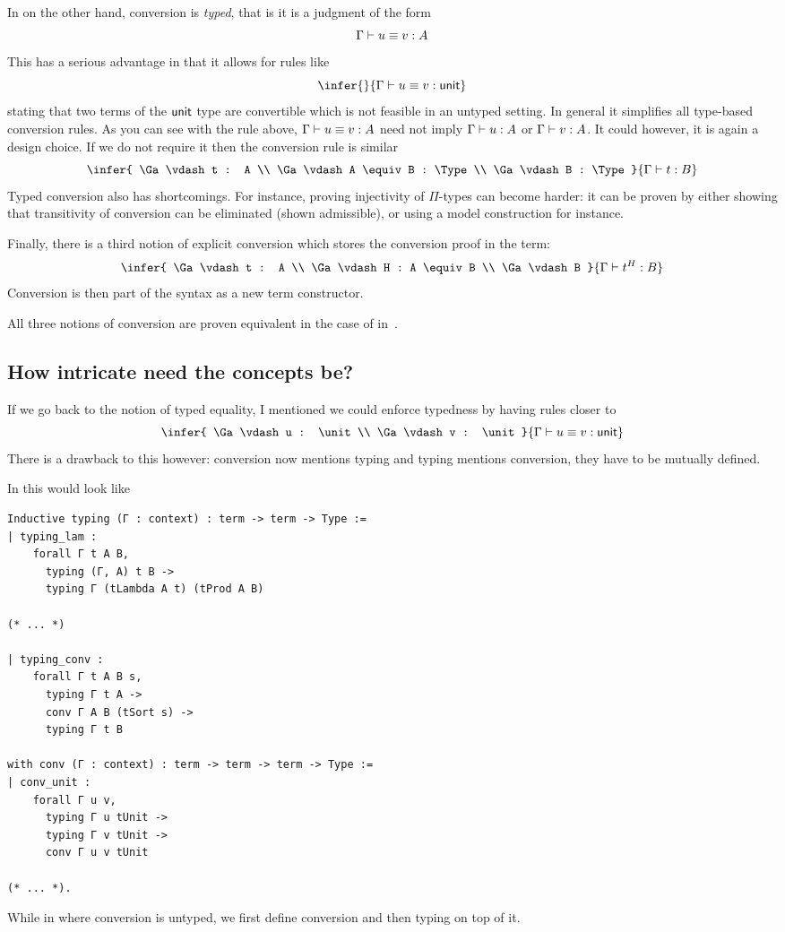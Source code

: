 In \Agda on the other hand, conversion is \emph{typed}, that is it is a judgment
of the form
\[
  \Gamma \vdash u \equiv v : A
\]
This has a serious advantage in that it allows for rules like
\[
  \infer
    { }
    {\Ga \vdash u \equiv v : \unit}
\]
stating that two terms of the \(\mathsf{unit}\) type are convertible which is not
feasible in an untyped setting. In general it simplifies all type-based
conversion rules. As you can see with the rule above,
\(\Gamma \vdash u \equiv v : A\) need not imply \(\Gamma \vdash u : A\) or
\(\Gamma \vdash v : A\). It could however, it is again a design choice.
If we do not require it then the conversion rule is similar
\[
  \infer
    {
      \Ga \vdash t : A \\
      \Ga \vdash A \equiv B : \Type \\
      \Ga \vdash B : \Type
    }
    {\Ga \vdash t : B}
\]
Typed conversion also has shortcomings. For instance, proving injectivity of
\(\Pi\)-types can become harder: it can be proven by either showing that
transitivity of conversion can be eliminated (\ie shown admissible), or using
a model construction for instance.

Finally, there is a third notion of explicit conversion which stores the
conversion proof in the term:
\[
  \infer
    {
      \Ga \vdash t : A \\
      \Ga \vdash H : A \equiv B \\
      \Ga \vdash B
    }
    {\Ga \vdash t^H : B}
\]
Conversion is then part of the syntax as a new term constructor.

All three notions of conversion are proven equivalent in the case of
 in~.

\subsection{How intricate need the concepts be?}

If we go back to the notion of typed equality, I mentioned we could enforce
typedness by having rules closer to
\[
  \infer
    {
      \Ga \vdash u : \unit \\
      \Ga \vdash v : \unit
    }
    {\Ga \vdash u \equiv v : \unit}
\]
There is a drawback to this however: conversion now mentions typing and typing
mentions conversion, they have to be mutually defined.

In \Coq this would look like
\begin{verbatim}
Inductive typing (Γ : context) : term -> term -> Type :=
| typing_lam :
    forall Γ t A B,
      typing (Γ, A) t B ->
      typing Γ (tLambda A t) (tProd A B)

(* ... *)

| typing_conv :
    forall Γ t A B s,
      typing Γ t A ->
      conv Γ A B (tSort s) ->
      typing Γ t B

with conv (Γ : context) : term -> term -> term -> Type :=
| conv_unit :
    forall Γ u v,
      typing Γ u tUnit ->
      typing Γ v tUnit ->
      conv Γ u v tUnit

(* ... *).
\end{verbatim}
While in \MetaCoq where conversion is untyped, we first define conversion
and then typing on top of it.

